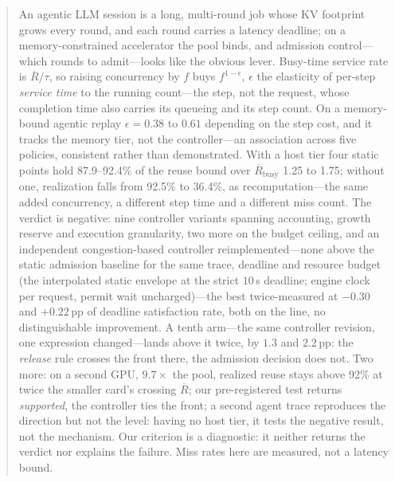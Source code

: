 \begin{abstract}
An agentic LLM session is a long, multi-round job whose KV footprint grows every
round, and each round carries a latency deadline; on a memory-constrained
accelerator the pool binds, and admission control---which rounds to admit---looks
like the obvious lever. Busy-time service rate is $\overline{R}/\tau$, so raising
concurrency by $f$ buys $f^{1-\epsilon}$, $\epsilon$ the elasticity of per-step
\emph{service time} to the running count---the step, not the request, whose
completion time also carries its queueing and its step count. On a memory-bound
agentic replay $\epsilon = 0.38$ to $0.61$ depending on the step cost, and it
tracks the memory tier, not the controller---an association across five policies,
consistent rather than demonstrated. With a host tier four static points hold
87.9--92.4\% of the reuse bound over $\overline{R}_{\text{busy}}$ 1.25 to 1.75;
without one, realization falls from 92.5\% to 36.4\%, as recomputation---the same
added concurrency, a different step time and a different miss count. The verdict
is negative: nine controller variants spanning accounting, growth reserve and
execution granularity, two more on the budget ceiling, and an independent
congestion-based controller reimplemented---none above the static admission
baseline for the same trace, deadline and resource budget (the interpolated
static envelope at the strict $10$\,s deadline; engine clock per request, permit
wait uncharged)---the best twice-measured at $-0.30$ and $+0.22$\,pp of deadline
satisfaction rate, both on the line, no distinguishable improvement. A tenth
arm---the same controller revision, one expression changed---lands above it
twice, by $1.3$ and $2.2$\,pp: the \emph{release} rule crosses the front there,
the admission decision does not. Two more: on a second GPU, $9.7\times$ the pool,
realized reuse stays above 92\% at twice the smaller card's crossing
$\overline{R}$; our pre-registered test returns \emph{supported}, the controller
ties the front; a second agent trace reproduces the direction but not the level:
having no host tier, it tests the negative result, not the mechanism. Our
criterion is a diagnostic: it neither returns the verdict nor explains the
failure. Miss rates here are measured, not a latency bound.
\end{abstract}
